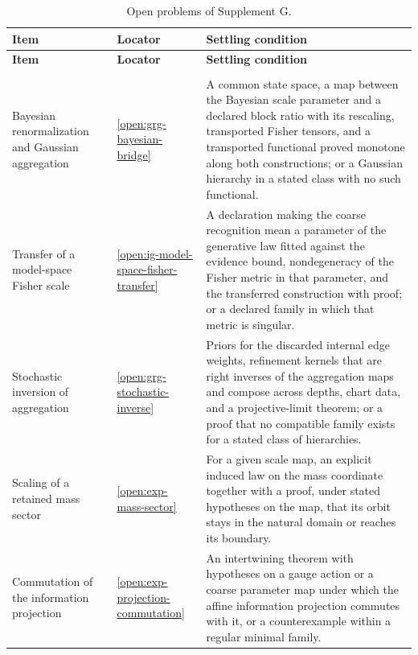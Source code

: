 {\footnotesize
\renewcommand{\arraystretch}{1.12}
\begin{longtable}{@{}>{\raggedright\arraybackslash}p{}
>{\raggedright\arraybackslash}p{}
>{\raggedright\arraybackslash}p{}@{}}
\caption{Open problems of Supplement G.}
\label{tab:gaussian-open}\\
\toprule
\textbf{Item} & \textbf{Locator} & \textbf{Settling condition} \\
\midrule
\endfirsthead
\toprule
\textbf{Item} & \textbf{Locator} & \textbf{Settling condition} \\
\midrule
\endhead
\midrule
\multicolumn{3}{r@{}}{\emph{continued on the next page}} \\
\endfoot
\bottomrule
\endlastfoot
Bayesian renormalization and Gaussian aggregation & \cref{open:grg-bayesian-bridge} & A common state space, a map between the Bayesian scale parameter and a declared block ratio with its rescaling, transported Fisher tensors, and a transported functional proved monotone along both constructions; or a Gaussian hierarchy in a stated class with no such functional. \\
Transfer of a model-space Fisher scale & \cref{open:ig-model-space-fisher-transfer} & A declaration making the coarse recognition mean a parameter of the generative law fitted against the evidence bound, nondegeneracy of the Fisher metric in that parameter, and the transferred construction with proof; or a declared family in which that metric is singular. \\
Stochastic inversion of aggregation & \cref{open:grg-stochastic-inverse} & Priors for the discarded internal edge weights, refinement kernels that are right inverses of the aggregation maps and compose across depths, chart data, and a projective-limit theorem; or a proof that no compatible family exists for a stated class of hierarchies. \\
Scaling of a retained mass sector & \cref{open:exp-mass-sector} & For a given scale map, an explicit induced law on the mass coordinate together with a proof, under stated hypotheses on the map, that its orbit stays in the natural domain or reaches its boundary. \\
Commutation of the information projection & \cref{open:exp-projection-commutation} & An intertwining theorem with hypotheses on a gauge action or a coarse parameter map under which the affine information projection commutes with it, or a counterexample within a regular minimal family. \\

\end{longtable}}
